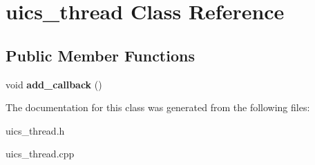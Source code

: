 \hypertarget{classuics__thread}{}\section{uics\+\_\+thread Class Reference}
\label{classuics__thread}
\subsection*{Public Member Functions}
\begin{DoxyCompactItemize}
\item 
void {\bfseries add\+\_\+callback} ()\hypertarget{classuics__thread_a1dfdb0a4dee37a9c4ca9e94c2a2ad494}{}\label{classuics__thread_a1dfdb0a4dee37a9c4ca9e94c2a2ad494}

\end{DoxyCompactItemize}


The documentation for this class was generated from the following files\+:\begin{DoxyCompactItemize}
\item 
uics\+\_\+thread.\+h\item 
uics\+\_\+thread.\+cpp\end{DoxyCompactItemize}
